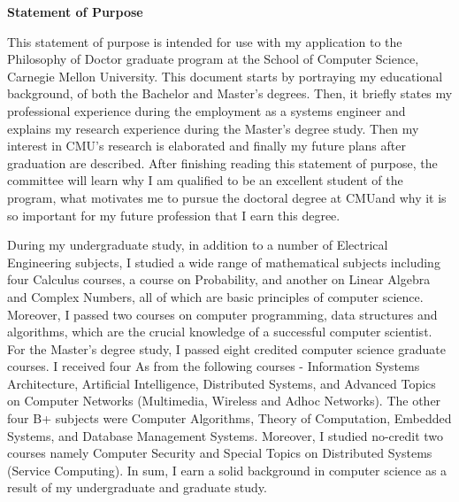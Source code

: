\documentclass[10pt,a4paper,oneside]{report}
\newcommand{\university}{Carnegie Mellon University}
\newcommand{\department}{School of Computer Science}
\newcommand{\uniabbre}{CMU}
\begin{document}
\begin{center}
\textbf{\large Statement of Purpose}
\end{center}

\vspace{0.4cm}
This statement of purpose is intended for use with my application to the Philosophy of Doctor graduate program at the \department, \university. This document starts by portraying my educational background, of both the Bachelor and Master's degrees. Then, it briefly states my professional experience during the employment as a systems engineer and explains my research experience during the Master's degree study. Then my interest in \uniabbre's research is elaborated and finally my future plans after graduation are described. After finishing reading this statement of purpose, the committee will learn why I am qualified to be an excellent student of the program, what motivates me to pursue the doctoral degree at \uniabbre \space and why it is so important for my future profession that I earn this degree.

\vspace{0.2cm}
During my undergraduate study, in addition to a number of Electrical Engineering subjects, I studied a wide range of mathematical subjects including four Calculus courses, a course on Probability, and another on Linear Algebra and Complex Numbers, all of which are basic principles of computer science. Moreover, I passed two courses on computer programming, data structures and algorithms, which are the crucial knowledge of a successful computer scientist. For the Master's degree study, I passed eight credited computer science graduate courses. I received four As from the following courses - Information Systems Architecture, Artificial Intelligence, Distributed Systems, and Advanced Topics on Computer Networks (Multimedia, Wireless and Adhoc Networks). The other four B+ subjects were Computer Algorithms, Theory of Computation, Embedded Systems, and Database Management Systems. Moreover, I studied no-credit two courses namely Computer Security and Special Topics on Distributed Systems (Service Computing). In sum, I earn a solid background in computer science as a result of my undergraduate and graduate study. 
\end{document}
